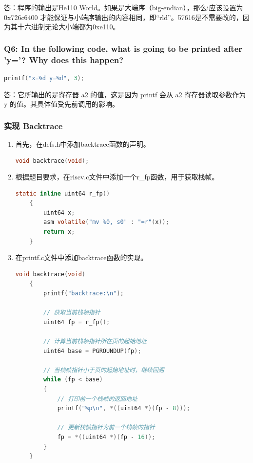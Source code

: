 答：程序的输出是He110 World。如果是大端序（big-endian），那么i应该设置为0x726c6400 才能保证与小端序输出的内容相同，即“rld”。57616是不需要改的，因为其十六进制无论大小端都为0xe110。

\subsubsection*{Q6: In the following code, what is going to be printed after 'y='? Why does this happen?}
\begin{lstlisting}[language=c, title=Code for Question]
    printf("x=%d y=%d", 3);
\end{lstlisting}

答：它所输出的是寄存器 a2 的值，这是因为 printf 会从 a2 寄存器读取参数作为
y 的值。其具体值受先前调用的影响。

\subsubsection{实现 Backtrace}
\begin{enumerate}
    \item 首先，在defs.h中添加backtrace函数的声明。
          \begin{lstlisting}[language=c, title=backtrace函数的声明]
    void backtrace(void);
    \end{lstlisting}
    \item 根据题目要求，在riscv.c文件中添加一个r\_fp函数，用于获取栈帧。
          \begin{lstlisting}[language=c, title=r\_fp函数的实现]
    static inline uint64 r_fp()
    {
        uint64 x;
        asm volatile("mv %0, s0" : "=r"(x));
        return x;
    }
    \end{lstlisting}
    \item 在printf.c文件中添加backtrace函数的实现。
          \begin{lstlisting}[language=c, title=backtrace函数的实现]
    void backtrace(void)
    {
        printf("backtrace:\n");

        // 获取当前栈帧指针
        uint64 fp = r_fp();

        // 计算当前栈帧指针所在页的起始地址
        uint64 base = PGROUNDUP(fp);

        // 当栈帧指针小于页的起始地址时，继续回溯
        while (fp < base)
        {
            // 打印前一个栈帧的返回地址
            printf("%p\n", *((uint64 *)(fp - 8)));

            // 更新栈帧指针为前一个栈帧的指针
            fp = *((uint64 *)(fp - 16));
        }
    }
    \end{lstlisting}
\end{enumerate}


